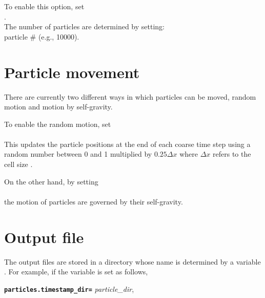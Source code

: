 To enable this option, set \\

. \\

\noindent The number of particles are determined by setting: \\

 particle \# (e.g., 10000).


\section{Particle movement}
\noindent There are currently two different ways in which particles can be moved, random motion and motion by self-gravity.

\noindent To enable the random motion, set \\

 \\

\noindent This updates the particle positions at the end of each coarse time step using a 
random number between 0 and 1 multiplied by $0.25 \Delta x$ where $\Delta x$ refers to the cell size .


\vspace{0.1in}
\noindent On the other hand, by setting \\

 \\

the motion of particles are governed by their self-gravity.




\section{Output file}
\label{particles:output_file}
\noindent The output files are stored in a directory whose name is determined by a variable \\
. For example, if the variable is set as follows,

\vspace{0.1in}
{\tt  {\bf particles.timestamp\_dir=}} {\em particle\_dir},
\vspace{0.1in}

